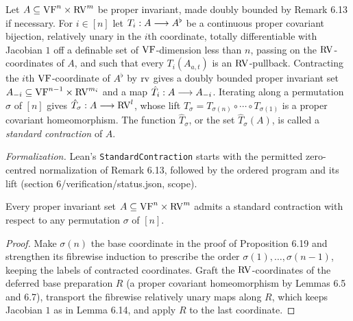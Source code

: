 \setcounter{theorem}{25}
\begin{definition}
\label{defn-standard-contraction}
\leanok
{}
Let $A\subseteq\mathrm{VF}^n\times\mathrm{RV}^m$ be proper invariant, made doubly bounded by Remark 6.13 if necessary. For $i\in[n]$ let $T_i:A\longrightarrow A^\flat$ be a continuous proper covariant bijection, relatively unary in the $i$th coordinate, totally differentiable with Jacobian $1$ off a definable set of $\mathrm{VF}$-dimension less than $n$, passing on the $\mathrm{RV}$-coordinates of $A$, and such that every $T_i(A_{a,t})$ is an $\mathrm{RV}$-pullback. Contracting the $i$th $\mathrm{VF}$-coordinate of $A^\flat$ by $\operatorname{rv}$ gives a doubly bounded proper invariant set $A_{-i}\subseteq\mathrm{VF}^{n-1}\times\mathrm{RV}^{m_i}$ and a map $\hat T_i:A\longrightarrow A_{-i}$. Iterating along a permutation $\sigma$ of $[n]$ gives $\hat T_\sigma:A\longrightarrow\mathrm{RV}^l$, whose lift $T_\sigma=T_{\sigma(n)}\circ\cdots\circ T_{\sigma(1)}$ is a proper covariant homeomorphism. The function $\hat T_\sigma$, or the set $\hat T_\sigma(A)$, is called a \emph{standard contraction} of $A$.

\emph{Formalization.} Lean's \texttt{StandardContraction} starts with the permitted zero-centred normalization of Remark 6.13, followed by the ordered program and its lift (section 6/verification/status.json, scope).
\end{definition}

\setcounter{theorem}{26}
\begin{lemma}
\label{exit-stand}
\leanok
{}
Every proper invariant set $A\subseteq\mathrm{VF}^n\times\mathrm{RV}^m$ admits a standard contraction with respect to any permutation $\sigma$ of $[n]$.
\end{lemma}

\begin{proof}
\leanok
Make $\sigma(n)$ the base coordinate in the proof of Proposition 6.19 and strengthen its fibrewise induction to prescribe the order $\sigma(1),\ldots,\sigma(n-1)$, keeping the labels of contracted coordinates. Graft the $\mathrm{RV}$-coordinates of the deferred base preparation $R$ (a proper covariant homeomorphism by Lemmas 6.5 and 6.7), transport the fibrewise relatively unary maps along $R$, which keeps Jacobian $1$ as in Lemma 6.14, and apply $R$ to the last coordinate.
\end{proof}

